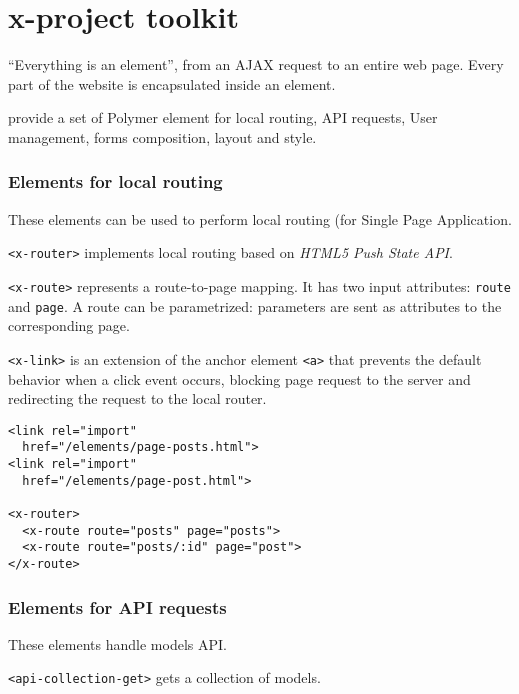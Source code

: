 \section{x-project toolkit}\label{sec:toolkit}

``Everything is an element'', from an AJAX request to an entire web page. Every part of the website is encapsulated inside an element. 

 provide a set of Polymer element for local routing, API requests, User management, forms composition, layout and style. 

\subsubsection{Elements for local routing}
These elements can be used to perform local routing (for Single Page Application.

\vspace{0.2cm}

\texttt{<x-router>} implements local routing based on \emph{HTML5 Push State API}. 

\vspace{0.2cm}

\texttt{<x-route>} represents a route-to-page mapping. It has two input attributes: \texttt{route} and \texttt{page}. A route can be parametrized: parameters are sent as attributes to the corresponding page.

\vspace{0.2cm}

\texttt{<x-link>} is an extension of the anchor element \texttt{<a>} that prevents the default behavior when a click event occurs, blocking page request to the server and redirecting the request to the local router. 

\begin{lstlisting}[language=HTML5]
<link rel="import" 
  href="/elements/page-posts.html">
<link rel="import" 
  href="/elements/page-post.html">

<x-router>
  <x-route route="posts" page="posts">
  <x-route route="posts/:id" page="post">
</x-route>
\end{lstlisting}


\subsubsection{Elements for API requests}
These elements handle models API.

\texttt{<api-collection-get>} gets a collection of models. 


